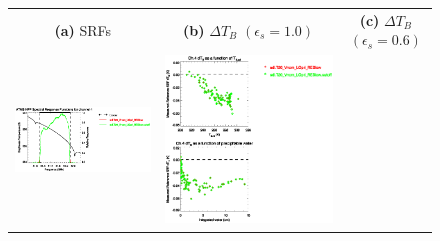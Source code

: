 \begin{figure}[H]
  \centering
  \begin{tabular}{c c c}
    \textsf{\textbf{(a)} SRFs} &
    \textsf{\textbf{(b)} $\Delta T_B$ $(\epsilon_s = 1.0)$} &
    \textsf{\textbf{(c)} $\Delta T_B$ $(\epsilon_s = 0.6)$} \\
    \includegraphics[bb=80 400 280 558,clip,scale=0.85]{graphics/srf/Rset/atms_npp.ch4.osrf.eps} &
    \includegraphics[bb=85 400 260 558,clip,scale=0.85]{graphics/dtb/Rset/e1.0_r0.0/atms_npp.ch4.dTb.eps} & 

\end{tabular}
\end{figure}
